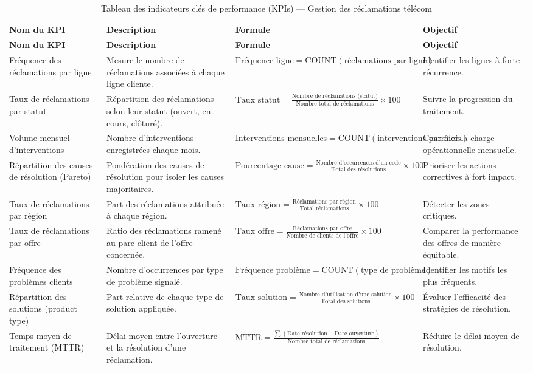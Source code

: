 \documentclass[10pt,a4paper]{report}
\begin{document}
\begin{longtable}{|p{3.1cm}|p{4.2cm}|p{4.6cm}|p{2.3cm}|}
\caption{Tableau des indicateurs clés de performance (KPIs) --- Gestion des réclamations télécom} \label{tab:kpi-311} \\
\hline
\textbf{Nom du KPI} & \textbf{Description} & \textbf{Formule} & \textbf{Objectif} \\
\hline
\endfirsthead
\hline
\textbf{Nom du KPI} & \textbf{Description} & \textbf{Formule} & \textbf{Objectif} \\
\hline
\endhead
\hline
\endfoot
Fréquence des réclamations par ligne & Mesure le nombre de réclamations associées à chaque ligne cliente. & $\text{Fréquence ligne} = \text{COUNT}(\text{réclamations par ligne})$ & Identifier les lignes à forte récurrence. \\
\hline
Taux de réclamations par statut & Répartition des réclamations selon leur statut (ouvert, en cours, clôturé). & $\text{Taux statut} = \frac{\text{Nombre de réclamations (statut)}}{\text{Nombre total de réclamations}} \times 100$ & Suivre la progression du traitement. \\
\hline
Volume mensuel d'interventions & Nombre d'interventions enregistrées chaque mois. & $\text{Interventions mensuelles} = \text{COUNT}(\text{interventions par mois})$ & Contrôler la charge opérationnelle mensuelle. \\
\hline
Répartition des causes de résolution (Pareto) & Pondération des causes de résolution pour isoler les causes majoritaires. & $\text{Pourcentage cause} = \frac{\text{Nombre d'occurrences d'un code}}{\text{Total des résolutions}} \times 100$ & Prioriser les actions correctives à fort impact. \\
\hline
Taux de réclamations par région & Part des réclamations attribuée à chaque région. & $\text{Taux région} = \frac{\text{Réclamations par région}}{\text{Total réclamations}} \times 100$ & Détecter les zones critiques. \\
\hline
Taux de réclamations par offre & Ratio des réclamations ramené au parc client de l'offre concernée. & $\text{Taux offre} = \frac{\text{Réclamations par offre}}{\text{Nombre de clients de l'offre}} \times 100$ & Comparer la performance des offres de manière équitable. \\
\hline
Fréquence des problèmes clients & Nombre d'occurrences par type de problème signalé. & $\text{Fréquence problème} = \text{COUNT}(\text{type de problème})$ & Identifier les motifs les plus fréquents. \\
\hline
Répartition des solutions (product type) & Part relative de chaque type de solution appliquée. & $\text{Taux solution} = \frac{\text{Nombre d'utilisation d'une solution}}{\text{Total des solutions}} \times 100$ & Évaluer l'efficacité des stratégies de résolution. \\
\hline
Temps moyen de traitement (MTTR) & Délai moyen entre l'ouverture et la résolution d'une réclamation. & $\text{MTTR} = \frac{\sum (\text{Date résolution} - \text{Date ouverture})}{\text{Nombre total de réclamations}}$ & Réduire le délai moyen de résolution. \\
\hline
\end{longtable}
\end{document}
